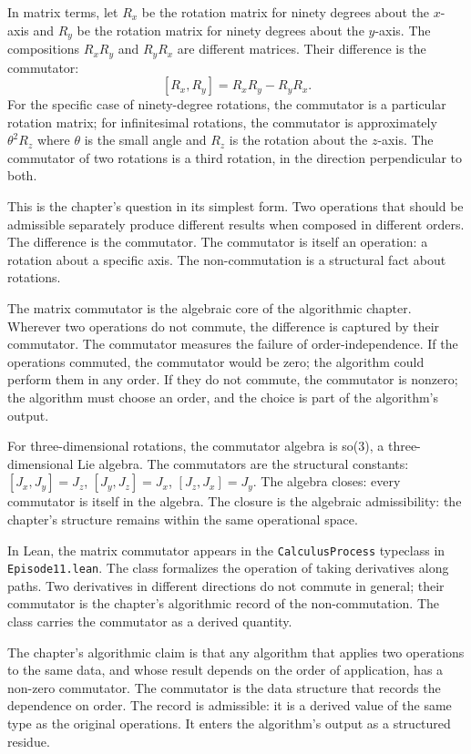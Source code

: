 In matrix terms, let $R_x$ be the rotation matrix for ninety degrees
about the $x$-axis and $R_y$ be the rotation matrix for ninety degrees
about the $y$-axis. The compositions $R_x R_y$ and $R_y R_x$ are
different matrices. Their difference is the commutator:
\[
[R_x, R_y] = R_x R_y - R_y R_x.
\]
For the specific case of ninety-degree rotations, the commutator is a
particular rotation matrix; for infinitesimal rotations, the
commutator is approximately $\theta^2 R_z$ where $\theta$ is the
small angle and $R_z$ is the rotation about the $z$-axis. The
commutator of two rotations is a third rotation, in the direction
perpendicular to both.

This is the chapter's question in its simplest form. Two operations
that should be admissible separately produce different results when
composed in different orders. The difference is the commutator. The
commutator is itself an operation: a rotation about a specific axis.
The non-commutation is a structural fact about rotations.

The matrix commutator is the algebraic core of the algorithmic
chapter. Wherever two operations do not commute, the difference is
captured by their commutator. The commutator measures the failure
of order-independence. If the operations commuted, the commutator
would be zero; the algorithm could perform them in any order. If
they do not commute, the commutator is nonzero; the algorithm must
choose an order, and the choice is part of the algorithm's output.

For three-dimensional rotations, the commutator algebra is so(3), a
three-dimensional Lie algebra. The commutators are the structural
constants: $[J_x, J_y] = J_z$, $[J_y, J_z] = J_x$, $[J_z, J_x] = J_y$.
The algebra closes: every commutator is itself in the algebra. The
closure is the algebraic admissibility: the chapter's structure
remains within the same operational space.

In Lean, the matrix commutator appears in the
\texttt{CalculusProcess} typeclass in \texttt{Episode11.lean}. The
class formalizes the operation of taking derivatives along paths.
Two derivatives in different directions do not commute in general;
their commutator is the chapter's algorithmic record of the
non-commutation. The class carries the commutator as a derived
quantity.

The chapter's algorithmic claim is that any algorithm that applies
two operations to the same data, and whose result depends on the
order of application, has a non-zero commutator. The commutator is
the data structure that records the dependence on order. The
record is admissible: it is a derived value of the same type as
the original operations. It enters the algorithm's output as a
structured residue.


